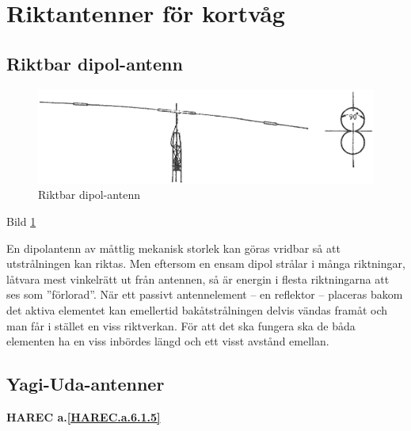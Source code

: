 \section{Riktantenner för kortvåg}

\subsection{Riktbar dipol-antenn}

\begin{figure}
  \includegraphics[width=\textwidth]{images/bild_2_6-17.png}
  \caption{Riktbar dipol-antenn}
  \label{fig:bildII6-17}
\end{figure}

Bild \ref{fig:bildII6-17}

En dipolantenn av måttlig mekanisk storlek kan göras vridbar så att
utstrålningen kan riktas. Men eftersom en ensam dipol strålar i många
riktningar, låtvara mest vinkelrätt ut från antennen, så är energin i
flesta riktningarna att ses som ''förlorad''. När ett passivt
antennelement -- en reflektor -- placeras bakom det aktiva elementet kan
emellertid bakåtstrålningen delvis vändas framåt och man får i stället
en viss riktverkan. För att det ska fungera ska de båda elementen
ha en viss inbördes längd och ett visst avstånd emellan.


\subsection{Yagi-Uda-antenner}
\textbf{
HAREC a.\ref{HAREC.a.6.1.5}\label{myHAREC.a.6.1.5}
}

